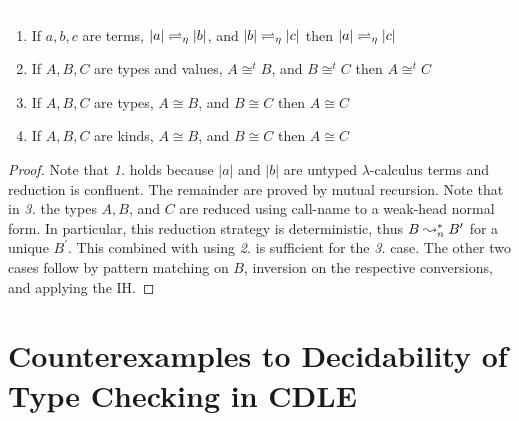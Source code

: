\begin{lemma}
    \label{lem:4:c1_trans}
    \textcolor{white}{\_}
    \begin{enumerate}
        \item If $a, b, c$ are terms, $|a| \rightleftharpoons_\eta |b|$, and $|b| \rightleftharpoons_\eta |c|$ then $|a| \rightleftharpoons_\eta |c|$
        \item If $A, B, C$ are types and values, $A \cong^t B$, and $B \cong^t C$ then $A \cong^t C$
        \item If $A, B, C$ are types, $A \cong B$, and $B \cong C$ then $A \cong C$
        \item If $A, B, C$ are kinds, $A \cong B$, and $B \cong C$ then $A \cong C$
    \end{enumerate}
\end{lemma}
\begin{proof}
    Note that \textit{1.} holds because $|a|$ and $|b|$ are untyped $\lambda$-calculus terms and reduction is confluent.
    The remainder are proved by mutual recursion.
    Note that in \textit{3.} the types $A, B$, and $C$ are reduced using call-name to a weak-head normal form.
    In particular, this reduction strategy is deterministic, thus $B \leadsto^*_n B^\prime$ for a unique $B^\prime$.
    This combined with using \textit{2.} is sufficient for the \textit{3.} case.
    The other two cases follow by pattern matching on $B$, inversion on the respective conversions, and applying the IH.
\end{proof}

\section{Counterexamples to Decidability of Type Checking in CDLE}

